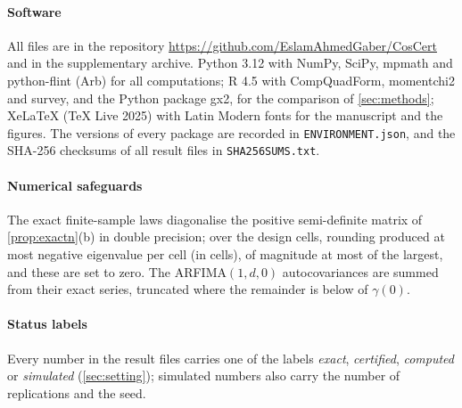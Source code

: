 \begin{table}[!tb]\centering\footnotesize\setlength{\tabcolsep}{4pt}
\caption{Independent checks of numerical results by type of evidence.}\label{tab:reproduction}
%
\end{table}

\paragraph{Software} All files are in the repository \url{https://github.com/EslamAhmedGaber/CosCert} and in the supplementary
archive. Python 3.12 with NumPy, SciPy, mpmath and python-flint (Arb) for all computations; R 4.5 with
CompQuadForm, momentchi2 and survey, and the Python package gx2, for the comparison of \cref{sec:methods}; XeLaTeX
(TeX Live 2025) with Latin Modern fonts for the manuscript and the figures. The versions of every package are recorded
in \texttt{ENVIRONMENT.json}, and the SHA-256 checksums of all result files in \texttt{SHA256SUMS.txt}.

\paragraph{Numerical safeguards} The exact finite-sample laws diagonalise the positive semi-definite matrix of
\cref{prop:exactn}(b) in double precision; over the  design cells, rounding produced at most
 negative eigenvalue per cell (in  cells), of magnitude at most 
of the largest, and these are set to zero. The ARFIMA$(1,d,0)$ autocovariances are summed from their exact series,
truncated where the remainder is below  of $\gamma(0)$.

\paragraph{Status labels} Every number in the result files carries one of the labels \emph{exact}, \emph{certified},
\emph{computed} or \emph{simulated} (\cref{sec:setting}); simulated numbers also carry the number of replications and
the seed.

\FloatBarrier
